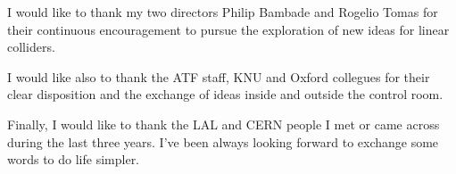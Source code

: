 \vfill
I would like to thank my two directors Philip Bambade and Rogelio Tomas for their continuous encouragement to pursue the exploration of new ideas for linear colliders.\par
I would like also to thank the ATF staff, KNU and Oxford collegues for their clear disposition and the exchange of ideas inside and outside the control room.\par
Finally, I would like to thank the LAL and CERN people I met or came across during the last three years. I've been always looking forward to exchange some words to do life simpler.\par

